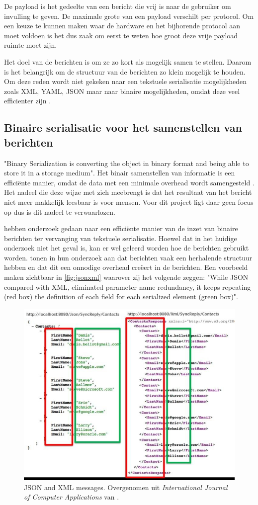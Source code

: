 \documentclass[a4paper, 11pt, oneside]{report}
\begin{document}
De payload is het gedeelte van een bericht die vrij is naar de gebruiker om invulling te geven.
De maximale grote van een payload verschilt per protocol.
Om een keuze te kunnen maken waar de hardware en het bijhorende protocol aan moet voldoen is het dus zaak om eerst te weten hoe groot deze vrije payload ruimte moet zijn.

Het doel van de berichten is om ze zo kort als mogelijk samen te stellen. 
Daarom is het belangrijk om de structuur van de berichten zo klein mogelijk te houden.
Om deze reden wordt niet gekeken naar een tekstuele serialisatie mogelijkheden zoals XML, YAML, JSON maar naar binaire mogelijkheden, omdat deze veel efficienter zijn \cite{binary}.

\subsection{Binaire serialisatie voor het samenstellen van berichten} 

"Binary Serialization is converting the object in binary format and being able to store it in a storage medium"\cite{binary}. 
Het binair samenstellen van informatie is een efficiënte manier, omdat de data met een minimale overhead wordt samengesteld \cite{binaryMessaging}.
Het nadeel die deze wijze met zich meebrengt is dat het resultaat van het bericht niet meer makkelijk leesbaar is voor mensen.
Voor dit project ligt daar geen focus op dus is dit nadeel te verwaarlozen.

 hebben onderzoek gedaan naar een efficiënte manier van de inzet van binaire berichten ter vervanging van tekstuele serialisatie.
Hoewel dat in het huidige onderzoek niet het geval is, kan er wel geleerd worden hoe de berichten gebruikt worden.
 tonen in hun onderzoek aan dat berichten vaak een herhalende structuur hebben en dat dit een onnodige overhead creëert in de berichten.
Een voorbeeld maken  zichtbaar in \autoref{fig:jsonxml} waarover zij het volgende zeggen: "While JSON  compared  with  XML,  eliminated  parameter  name redundancy, it keeps repeating (red box) the definition of each field  for  each  serialized  element  (green  box)". 
\begin{figure}[H]
	\begin{center}\includegraphics[width=0.5\linewidth]{JSONandXML.jpeg}\end{center}
	\caption{JSON and XML messages. Overgenomen uit \textit{International Journal of Computer Applications}  van \protect{}.}
	\label{fig:jsonxml}
\end{figure}
\end{document}
